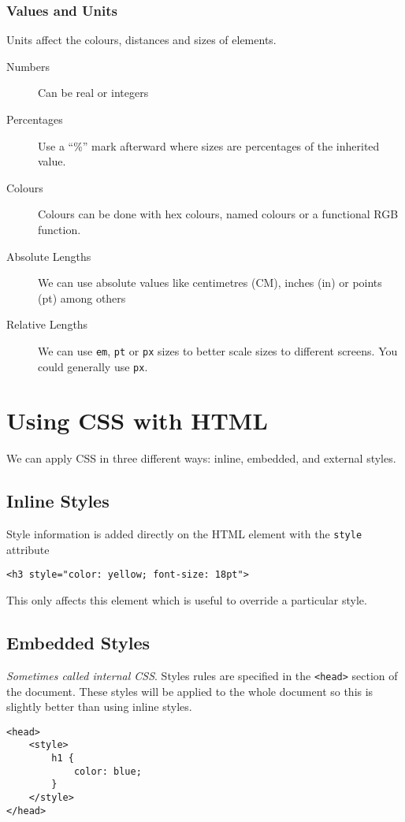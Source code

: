 \subsubsection{Values and Units}\label{ssub:values_and_units}

Units affect the colours, distances and sizes of elements.
\begin{description}
	\item[Numbers] Can be real or integers
	\item[Percentages] Use a ``\%'' mark afterward where sizes are percentages of the inherited value.
	\item[Colours] Colours can be done with hex colours, named colours or a functional RGB function.
	\item[Absolute Lengths] We can use absolute values like centimetres (CM), inches (in) or points (pt) among others
	\item[Relative Lengths] We can use \texttt{em}, \texttt{pt} or \texttt{px} sizes to better scale sizes to different screens.
	      You could generally use \texttt{px}.
\end{description}

\section{Using CSS with HTML}\label{sec:using_css_with_html}

We can apply CSS in three different ways: inline, embedded, and external styles.

\subsection{Inline Styles}\label{sub:inline_styles}

Style information is added directly on the HTML element with the \texttt{style} attribute
\begin{verbatim}
<h3 style="color: yellow; font-size: 18pt">
\end{verbatim}
This only affects this element which is useful to override a particular style.

\subsection{Embedded Styles}\label{sub:embedded_styles}

\emph{Sometimes called internal CSS}.
Styles rules are specified in the \texttt{<head>} section of the document.
These styles will be applied to the whole document so this is slightly better than using inline styles.
\begin{verbatim}
<head>
    <style>
        h1 {
            color: blue;
        }
    </style>
</head>
\end{verbatim}

